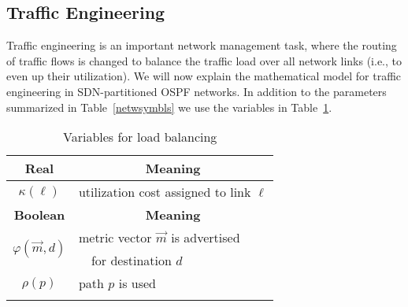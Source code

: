 \documentclass[journal]{IEEEtran}
\begin{document}
\subsection{Traffic Engineering}\label{math_te}
Traffic engineering is an important network management task, where the routing of traffic flows is changed to balance the traffic load over all network links (i.e., to even up their utilization). We will now explain the mathematical model for traffic engineering in SDN-partitioned OSPF networks. In addition to the parameters summarized in Table~\ref{netwsymbls} we use the variables in Table~\ref{TE_vars}.

\begin{table}[t]\begin{center}\footnotesize
\begin{tabular}{ c l }
\toprule
\textbf{Real} & \multicolumn{1}{c}{\textbf{Meaning}} \\
\midrule
$\kappa(\ell)$ & utilization cost assigned to link $\ell$ \\\addlinespace[1.0mm]
\midrule
\textbf{Boolean} & \multicolumn{1}{c}{\textbf{Meaning}} \\
\midrule
\multirow{2}{*}{$\varphi (\vec{m}, d)$} & metric vector $\vec{m}$ is advertised \\
 & $\text{ }$ for destination $d$ \\\addlinespace[1.0mm]
$\rho(p)$ & path $p$ is used \\\addlinespace[1.0mm]
\bottomrule
\end{tabular}\normalsize
\caption{Variables for load balancing}\label{TE_vars}
\end{center}\end{table}
\end{document}
